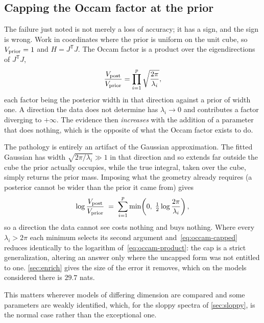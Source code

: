 \documentclass[10pt]{article}
\begin{document}
\subsection{Capping the Occam factor at the prior}
\label{sec:occam-cap}

The failure just noted is not merely a loss of accuracy; it has a sign, and the sign is
wrong. Work in coordinates where the prior is uniform on the unit cube, so
$V_{\rm prior} = 1$ and $H = J^{\mathsf T}J$. The Occam factor is a product over the
eigendirections of $J^{\mathsf T}J$,
%
\begin{equation}
\frac{V_{\rm post}}{V_{\rm prior}} = \prod_{i=1}^{p}\sqrt{\frac{2\pi}{\lambda_i}},
\label{eq:occam-product}
\end{equation}
%
each factor being the posterior width in that direction against a prior of width one. A
direction the data does not determine has $\lambda_i \to 0$ and contributes a factor
diverging to $+\infty$. The evidence then \emph{increases} with the addition of a parameter
that does nothing, which is the opposite of what the Occam factor exists to do.

The pathology is entirely an artifact of the Gaussian approximation. The fitted Gaussian has
width $\sqrt{2\pi/\lambda_i} \gg 1$ in that direction and so extends far outside the cube the
prior actually occupies, while the true integral, taken over the cube, simply returns the
prior mass. Imposing what the geometry already requires (a posterior cannot be wider than
the prior it came from) gives
%
\begin{equation}
\log\frac{V_{\rm post}}{V_{\rm prior}} \;=\; \sum_{i=1}^{p}\min\!\left(0,\;
  \tfrac12\log\frac{2\pi}{\lambda_i}\right),
\label{eq:occam-capped}
\end{equation}
%
so a direction the data cannot see costs nothing and buys nothing. Where every
$\lambda_i > 2\pi$ each minimum selects its second argument
and~\eqref{eq:occam-capped} reduces identically to the logarithm
of~\eqref{eq:occam-product}: the cap is a strict generalization, altering an answer only
where the uncapped form was not entitled to one. \cref{sec:enrich} gives the size of the
error it removes, which on the models considered there is $29.7$ nats.

This matters wherever models of differing dimension are compared and some parameters are
weakly identified, which, for the sloppy spectra of \cref{sec:sloppy}, is the normal
case rather than the exceptional one.
\end{document}
